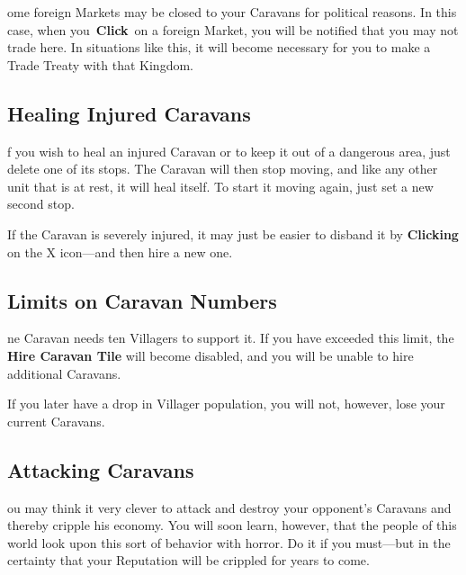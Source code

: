 
ome foreign Markets may be closed to your Caravans for political reasons. In this case, when you \textbf{Click} on a foreign Market, you will be notified that you may not trade here. In situations like this, it will become necessary for you to make a Trade Treaty with that Kingdom.

\subsection{Healing Injured Caravans}


f you wish to heal an injured Caravan or to keep it out of a dangerous area, just delete one of its stops. The Caravan will then stop moving, and like any other unit that is at rest, it will heal itself. To start it moving again, just set a new second stop.

If the Caravan is severely injured, it may just be easier to disband it by \textbf{Clicking} on the X icon---and then hire a new one.

\subsection{Limits on Caravan Numbers}


ne Caravan needs ten Villagers to support it. If you have exceeded this limit, the \textbf{Hire Caravan Tile} will become disabled, and you will be unable to hire additional Caravans.

If you later have a drop in Villager population, you will not, however, lose your current Caravans.

\subsection{Attacking Caravans}


ou may think it very clever to attack and destroy your opponent’s Caravans and thereby cripple his economy. You will soon learn, however, that the people of this world look upon this sort of behavior with horror. Do it if you must---but in the certainty that your Reputation will be crippled for years to come.

